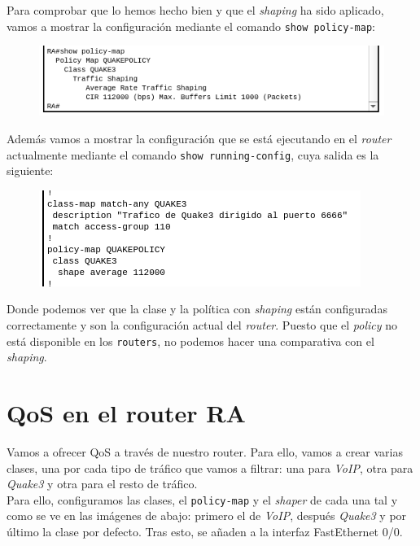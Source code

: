 \documentclass[11pt,a4paper]{article}
\begin{document}
Para comprobar que lo hemos hecho bien y que el \textit{shaping} ha sido aplicado, vamos a mostrar la configuración mediante el comando \texttt{show policy-map}:

\begin{figure}[H]
	\centering
	\includegraphics[scale=0.7]{img/show-shaping.png}
\end{figure}

Además vamos a mostrar la configuración que se está ejecutando en el \textit{router} actualmente mediante el comando \texttt{show running-config}, cuya salida es la siguiente:

\begin{figure}[H]
	\centering
	\includegraphics[scale=0.7]{img/show-running-config-shaping.png}
\end{figure}

Donde podemos ver que la clase y la política con \textit{shaping} están configuradas correctamente y son la configuración actual del \textit{router}. Puesto que el \textit{policy} no está disponible en los \texttt{routers}, no podemos hacer una comparativa con el \textit{shaping}.

\newpage

\section{QoS en el router RA}

Vamos a ofrecer QoS a través de nuestro router. Para ello, vamos a crear varias clases, una por cada tipo de tráfico que vamos a filtrar: una para \textit{VoIP}, otra para \textit{Quake3} y otra para el resto de tráfico.\\

Para ello, configuramos las clases, el \texttt{policy-map} y el \textit{shaper} de cada una tal y como se ve en las imágenes de abajo: primero el de \textit{VoIP}, después \textit{Quake3} y por último la clase por defecto. Tras esto, se añaden a la interfaz FastEthernet 0/0.
\end{document}
